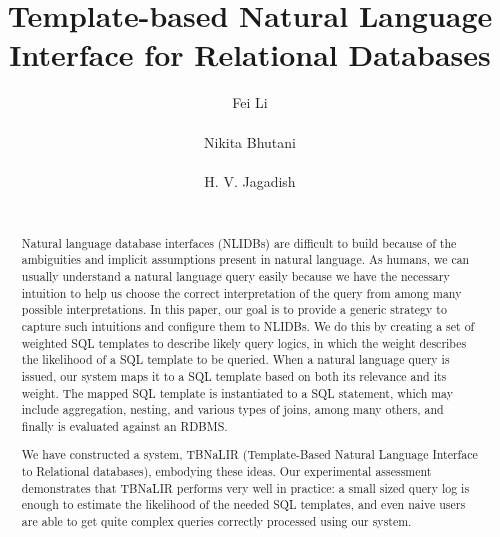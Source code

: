 \documentclass{vldb}
\begin{document}
\title{Template-based Natural Language Interface for Relational Databases}

\author{
\alignauthor Fei Li\\
       \\
\alignauthor
Nikita Bhutani\\
       \\
\alignauthor
H. V. Jagadish\\
       \\
}

\maketitle

\begin{abstract}
Natural language database interfaces (NLIDBs) are difficult to build because of the ambiguities and implicit assumptions present in natural language.  As humans, we can usually understand a natural language query easily because we have the necessary intuition to help us choose the correct interpretation of the query from among many possible interpretations.  In this paper, our goal is to provide a generic strategy to capture such intuitions and configure them to NLIDBs.  We do this by creating a set of weighted SQL templates to describe likely query logics, in which the weight describes the likelihood of a SQL template to be queried.   When a natural language query is issued, our system maps it to a SQL template based on both its relevance and its weight.  The mapped SQL template is instantiated to a SQL statement, which may include aggregation, nesting, and various types of joins, among many others, and finally is evaluated against an RDBMS.

We have constructed a system, TBNaLIR (Template-Based Natural Language Interface to Relational databases), embodying these ideas. Our experimental assessment demonstrates that TBNaLIR performs very well in practice: a small sized query log is enough to estimate the likelihood of the needed SQL templates, and even naive users are able to get quite complex queries correctly processed using our system.
\end{abstract}

\end{document}
